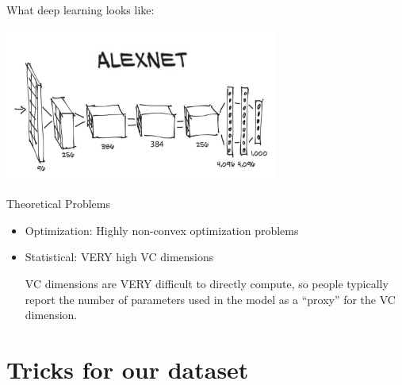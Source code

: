 \documentclass[10pt]{exam}
\theoremstyle{definition}
\begin{document}
\noindent
What deep learning looks like:

\includegraphics[height=2in]{alexnet}

%
\noindent
Theoretical Problems
\begin{itemize}
    \item Optimization: Highly non-convex optimization problems
        \vspace{1in}

    \item Statistical: VERY high VC dimensions

    VC dimensions are VERY difficult to directly compute,
    so people typically report the number of parameters used in the model as a ``proxy'' for the VC dimension.

        \vspace{2in}


%
\end{itemize}

\newpage
\section{Tricks for our dataset}
\end{document}
